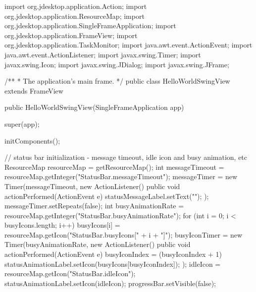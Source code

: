import org.jdesktop.application.Action;
import org.jdesktop.application.ResourceMap;
import org.jdesktop.application.SingleFrameApplication;
import org.jdesktop.application.FrameView;
import org.jdesktop.application.TaskMonitor;
import java.awt.event.ActionEvent;
import java.awt.event.ActionListener;
import javax.swing.Timer;
import javax.swing.Icon;
import javax.swing.JDialog;
import javax.swing.JFrame;

/**
 * The application's main frame.
 */
public class HelloWorldSwingView extends FrameView {

    public HelloWorldSwingView(SingleFrameApplication app) {
        super(app);

        initComponents();

        // status bar initialization - message timeout, idle icon and busy animation, etc
        ResourceMap resourceMap = getResourceMap();
        int messageTimeout = resourceMap.getInteger("StatusBar.messageTimeout");
        messageTimer = new Timer(messageTimeout, new ActionListener() {
            public void actionPerformed(ActionEvent e) {
                statusMessageLabel.setText("");
            }
        });
        messageTimer.setRepeats(false);
        int busyAnimationRate = resourceMap.getInteger("StatusBar.busyAnimationRate");
        for (int i = 0; i < busyIcons.length; i++) {
            busyIcons[i] = resourceMap.getIcon("StatusBar.busyIcons[" + i + "]");
        }
        busyIconTimer = new Timer(busyAnimationRate, new ActionListener() {
            public void actionPerformed(ActionEvent e) {
                busyIconIndex = (busyIconIndex + 1) %
                statusAnimationLabel.setIcon(busyIcons[busyIconIndex]);
            }
        });
        idleIcon = resourceMap.getIcon("StatusBar.idleIcon");
        statusAnimationLabel.setIcon(idleIcon);
        progressBar.setVisible(false);

}}
